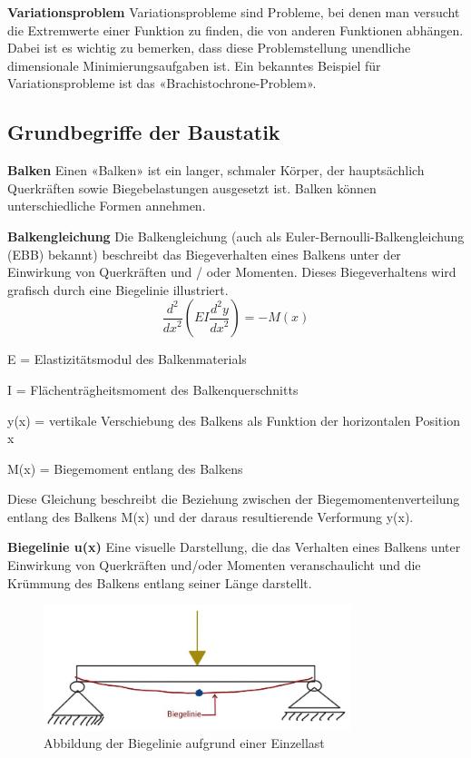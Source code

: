 \textbf{Variationsproblem}
Variationsprobleme sind Probleme, bei denen man versucht die Extremwerte einer Funktion zu finden, die von anderen Funktionen abhängen.
Dabei ist es wichtig zu bemerken, dass diese Problemstellung unendliche dimensionale Minimierungsaufgaben ist.
Ein bekanntes Beispiel für Variationsprobleme ist das «Brachistochrone-Problem».

\subsection{Grundbegriffe der Baustatik}
\textbf{Balken}
Einen «Balken» ist ein langer, schmaler Körper, der hauptsächlich Querkräften sowie Biegebelastungen ausgesetzt ist.
Balken können unterschiedliche Formen annehmen.

\textbf{Balkengleichung}
Die Balkengleichung (auch als Euler-Bernoulli-Balkengleichung (EBB) bekannt) beschreibt das Biegeverhalten eines Balkens unter der Einwirkung von Querkräften und / oder Momenten.
Dieses Biegeverhaltens wird grafisch durch eine Biegelinie illustriert.
\begin{equation}
	\frac{d^2}{{dx}^2}\left(EI\frac{d^2y}{{dx}^2}\right)
	=-M(x)
\end{equation}

E = Elastizitätsmodul des Balkenmaterials

I = Flächenträgheitsmoment des Balkenquerschnitts

y(x) = vertikale Verschiebung des Balkens als Funktion der horizontalen Position x

M(x) = Biegemoment entlang des Balkens

Diese Gleichung beschreibt die Beziehung zwischen der Biegemomentenverteilung entlang des Balkens M(x) und der daraus resultierende Verformung y(x).

\textbf{Biegelinie u(x)}
Eine visuelle Darstellung, die das Verhalten eines Balkens unter Einwirkung von Querkräften und/oder Momenten veranschaulicht und die Krümmung des Balkens entlang seiner Länge darstellt.
\begin{figure} [h]
	\centering
	\includegraphics[width=0.8\textwidth]{papers/balken/images/teil1/Biegelinie1.jpg}
	\caption{Abbildung der Biegelinie aufgrund einer Einzellast}
	\label{fig:Abbildung der Biegelinie aufgrund einer Einzellast}
\end{figure}

